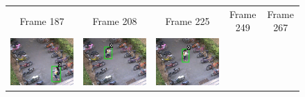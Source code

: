 \begin{frame}
\begin{figure}[t]
\begin{tabular}{ccccc}
            \small Frame 187 & 
            \small Frame 208 & 
            \small Frame 225 & 
            \small Frame 249 & 
            \small Frame 267 \\
            \includegraphics[scale=0.17]{figures/case-2-suspicious-0188} &
            \includegraphics[scale=0.17]{figures/case-2-suspicious-0334} &
            \includegraphics[scale=0.17]{figures/case-2-suspicious-0344} &

\end{tabular}
\end{figure}
\end{frame}
